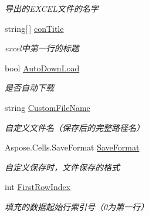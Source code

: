 \begin{DoxyCompactItemize}
\begin{DoxyCompactList}\small\item\em 导出的\-E\-X\-C\-E\-L文件的名字 \end{DoxyCompactList}\item 
string\mbox{[}$\,$\mbox{]} \hyperlink{class_x_c_l_net_tools_1_1_data_handler_1_1_out_put_param_class_a748b563923eab10a0c8f5434fb5a3b16}{con\-Title}
\begin{DoxyCompactList}\small\item\em excel中第一行的标题 \end{DoxyCompactList}\item 
bool \hyperlink{class_x_c_l_net_tools_1_1_data_handler_1_1_out_put_param_class_a1e1c3490df66e969da5c506f62e39c40}{Auto\-Down\-Load}
\begin{DoxyCompactList}\small\item\em 是否自动下载 \end{DoxyCompactList}\item 
string \hyperlink{class_x_c_l_net_tools_1_1_data_handler_1_1_out_put_param_class_a1080824136a31b39d2cc48459f8d1271}{Custom\-File\-Name}
\begin{DoxyCompactList}\small\item\em 自定义文件名（保存后的完整路径名） \end{DoxyCompactList}\item 
Aspose.\-Cells.\-Save\-Format \hyperlink{class_x_c_l_net_tools_1_1_data_handler_1_1_out_put_param_class_a0557dded3644a3e7bfa850c11624f015}{Save\-Format}
\begin{DoxyCompactList}\small\item\em 自定义保存时，文件保存的格式 \end{DoxyCompactList}\item 
int \hyperlink{class_x_c_l_net_tools_1_1_data_handler_1_1_out_put_param_class_a2fce0d6591ecfcef5f4d469d5739e326}{First\-Row\-Index}
\begin{DoxyCompactList}\small\item\em 填充的数据起始行索引号（0为第一行） \end{DoxyCompactList}\item 

\end{DoxyCompactItemize}
